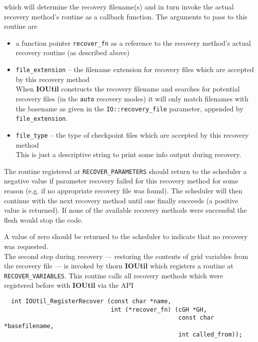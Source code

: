 \documentclass{article}
\begin{document}
which will determine the recovery filename(s) and in turn invoke the actual
recovery method's routine as a callback function. The arguments to pass to this
routine are

\begin{itemize}
  \item a function pointer {\tt recover\_fn} as a reference to the recovery
    method's actual recovery routine (as described above)

  \item {\tt file\_extension} -- the filename extension for recovery files
    which are accepted by this recovery method\\
    When {\bf IOUtil} constructs the recovery filename and searches for
    potential recovery files (in the {\tt auto} recovery modes) it will only
    match filenames with the basename as given in the {\tt IO::recovery\_file}
    parameter, appended by {\tt file\_extension}.

  \item {\tt file\_type} -- the type of checkpoint files which are accepted by
    this recovery method\\
    This is just a descriptive string to print some info output during recovery.
\end{itemize}

The routine registered at {\tt RECOVER\_PARAMETERS} should return to
the scheduler a negative value if parameter recovery failed for this recovery
method for some reason (e.g. if no appropriate recovery file was found).
The scheduler will then continue with the next recovery method until one
finally succeeds (a positive value is returned). If none of the available
recovery methods were successful the flesh would stop the code.

A value of zero should be returned to the scheduler to indicate that no
recovery was requested.\\

The second step during recovery --- restoring the contents of grid variables
from the recovery file --- is invoked by thorn {\bf IOUtil} which registers
a routine at {\tt RECOVER\_VARIABLES}. This routine calls all recovery
methods which were registered before with {\bf IOUtil} via the API

\begin{verbatim}
  int IOUtil_RegisterRecover (const char *name,
                              int (*recover_fn) (cGH *GH,
                                                 const char *basefilename,
                                                 int called_from));
\end{verbatim}
\end{document}
